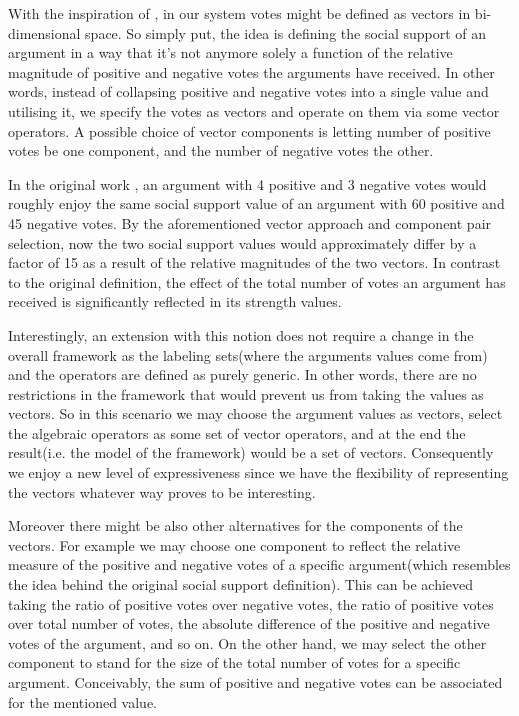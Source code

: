 \documentclass{article}
\begin{document}
With the inspiration of \cite{baroniTAB13}, in our system votes might be defined as vectors in bi-dimensional space. So simply put, the idea is defining the social support of an argument in a way that it's not anymore solely a function of the relative magnitude of positive and negative votes the arguments have received. In other words, instead of collapsing positive and negative votes into a single value and utilising it,  we specify the votes as vectors and operate on them via some vector operators. A possible choice of vector components is letting number of positive votes be one component, and the number of negative votes the other. 

In the original work \cite{leite2011social},  an argument with 4 positive and 3 negative votes would roughly enjoy the same social support value of an argument with 60 positive and 45 negative votes. By the aforementioned vector approach and component pair selection, now the two social support values would approximately differ by a factor of 15 as a result of the relative magnitudes of the two vectors. In contrast to the original definition, the effect of the total number of votes an argument has received is significantly reflected in its strength values.

Interestingly, an extension with this notion does not require a change in the overall framework as the labeling sets(where the arguments values come from) and the operators are defined as purely generic. In other words, there are no restrictions in the framework that would prevent us from taking the values as vectors. So in this scenario we may choose the argument values as vectors, select the algebraic operators as some set of vector operators, and at the end the result(i.e. the model of the framework) would be a set of vectors. Consequently we enjoy a new level of expressiveness since we have the flexibility of representing the vectors whatever way proves to be interesting.

Moreover there might be also other alternatives for the components of the vectors. For example we may choose one component to reflect the relative measure of the positive and negative votes of a specific argument(which resembles the idea behind the original social support definition). This can be achieved taking the ratio of positive votes over negative votes, the ratio of positive votes over total number of votes, the absolute difference of the positive and negative votes of the argument, and so on. On the other hand, we may select the other component to stand for the size of the total number of votes for a specific argument. Conceivably, the sum of positive and negative votes can be associated for the mentioned value.
\end{document}
